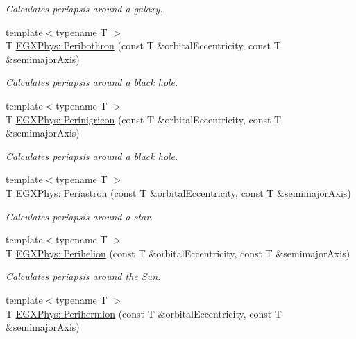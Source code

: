 \begin{DoxyCompactItemize}
\begin{DoxyCompactList}\small\item\em Calculates periapsis around a galaxy. \end{DoxyCompactList}\item 
{\footnotesize template$<$typename T $>$ }\\T \mbox{\hyperlink{group___e_g_x_phys-_periapsis_gada5892309279a3a687c4eb2f88238e4e}{E\+G\+X\+Phys\+::\+Peribothron}} (const T \&orbital\+Eccentricity, const T \&semimajor\+Axis)
\begin{DoxyCompactList}\small\item\em Calculates periapsis around a black hole. \end{DoxyCompactList}\item 
{\footnotesize template$<$typename T $>$ }\\T \mbox{\hyperlink{group___e_g_x_phys-_periapsis_ga99d86af90179994e17158b082c502fd4}{E\+G\+X\+Phys\+::\+Perinigricon}} (const T \&orbital\+Eccentricity, const T \&semimajor\+Axis)
\begin{DoxyCompactList}\small\item\em Calculates periapsis around a black hole. \end{DoxyCompactList}\item 
{\footnotesize template$<$typename T $>$ }\\T \mbox{\hyperlink{group___e_g_x_phys-_periapsis_ga477de6824cbb5986cdae923141e21648}{E\+G\+X\+Phys\+::\+Periastron}} (const T \&orbital\+Eccentricity, const T \&semimajor\+Axis)
\begin{DoxyCompactList}\small\item\em Calculates periapsis around a star. \end{DoxyCompactList}\item 
{\footnotesize template$<$typename T $>$ }\\T \mbox{\hyperlink{group___e_g_x_phys-_periapsis_ga941d285e3a0b48ada9c9f60925ff63c2}{E\+G\+X\+Phys\+::\+Perihelion}} (const T \&orbital\+Eccentricity, const T \&semimajor\+Axis)
\begin{DoxyCompactList}\small\item\em Calculates periapsis around the Sun. \end{DoxyCompactList}\item 
{\footnotesize template$<$typename T $>$ }\\T \mbox{\hyperlink{group___e_g_x_phys-_periapsis_ga9562e9cbfd73019ae9cdaa643b843d63}{E\+G\+X\+Phys\+::\+Perihermion}} (const T \&orbital\+Eccentricity, const T \&semimajor\+Axis)

\end{DoxyCompactItemize}
